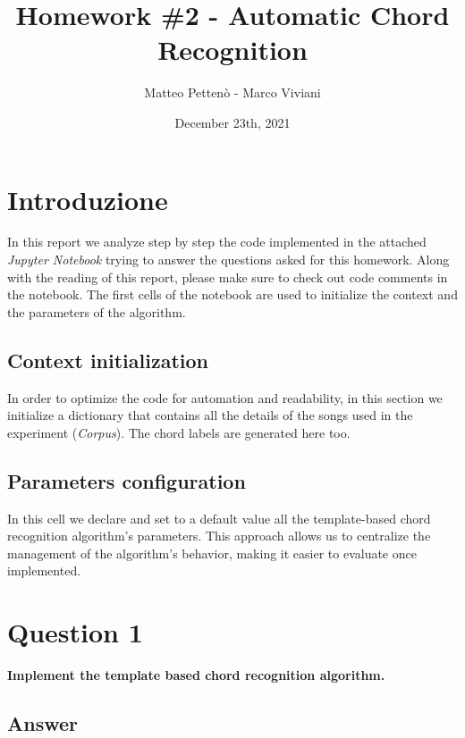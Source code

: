 \documentclass[
	12pt, %
]{fphw}
\title{Homework \#2 - Automatic Chord Recognition} %
\author{Matteo Pettenò - Marco Viviani} %
\date{December 23th, 2021} %
\institute{Politecnico di Milano} %
\begin{document}
\maketitle %


\section*{Introduzione}

In this report we analyze step by step the code implemented in the attached \emph{Jupyter Notebook} trying to answer the questions asked for this homework. Along with the reading of this report, please make sure to check out code comments in the notebook. The first cells of the notebook are used to initialize the context and the parameters of the algorithm.

\subsection*{Context initialization}
In order to optimize the code for automation and readability, in this section we initialize a dictionary that contains all the details of the songs used in the experiment (\emph{Corpus}). The chord labels are generated here too.

\subsection*{Parameters configuration}
In this cell we declare and set to a default value all the template-based chord recognition algorithm's parameters. This approach allows us to centralize the management of the algorithm's behavior, making it easier to evaluate once implemented.

\section*{\color{red}Question 1}

\begin{problem}
	\textbf{Implement the template based chord recognition algorithm.}
\end{problem}

\subsection*{\color{blue}Answer}
\end{document}
